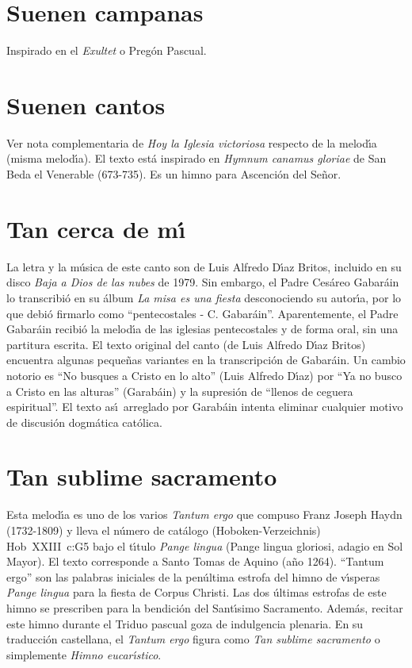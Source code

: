 \documentclass[landscape,12pt]{report}
\begin{document}
\section*{\small Suenen campanas} \noindent\footnotesize Inspirado en el \textit{Exultet} o Preg\'on Pascual.
\section*{\small Suenen cantos} Ver nota complementaria de \textit{Hoy la Iglesia victoriosa} respecto de la melod\'\i a (misma melod\'\i a). El texto est\'a inspirado en \textit{Hymnum canamus gloriae} de San Beda el Venerable (673-735). Es un himno para Ascenci\'on del Se\~nor.
\section*{\small Tan cerca de m\'\i } \noindent\footnotesize La letra y la m\'usica de este canto son de Luis Alfredo D\'\i az Britos, incluido en su disco \emph{Baja a Dios de las nubes} de 1979. Sin embargo, el Padre Ces\'areo Gabar\'ain lo transcribi\'o en su \'album \emph{La misa es una fiesta} desconociendo su autor\'\i a, por lo que debi\'o firmarlo como ``pentecostales - C. Gabar\'ain''. Aparentemente, el Padre Gabar\'ain recibi\'o la melod\'\i a de las iglesias pentecostales y de forma oral, sin una partitura escrita. El texto original del canto (de Luis Alfredo D\'\i az Britos) encuentra algunas peque\~nas variantes en la transcripci\'on de Gabar\'ain. Un cambio notorio es ``No busques a Cristo en lo alto'' (Luis Alfredo D\'\i az) por ``Ya no busco a Cristo en las alturas'' (Garab\'ain) y la supresi\'on de ``llenos de ceguera espiritual''. El texto as\'\i\ arreglado por Garab\'ain intenta eliminar cualquier motivo de discusi\'on dogm\'atica cat\'olica.
\section*{\small Tan sublime sacramento} \noindent\footnotesize Esta melod\'\i a es uno de los varios \textit{Tantum ergo} que compuso Franz Joseph Haydn (1732-1809) y lleva el n\'umero de cat\'alogo (Hoboken-Verzeichnis) Hob~XXIII~c:G5 bajo el t\'\i tulo \textit{Pange lingua} (Pange lingua gloriosi, adagio en Sol Mayor). El texto corresponde a Santo Tomas de Aquino (a\~no 1264). ``Tantum ergo'' son las palabras iniciales de la pen\'ultima estrofa del himno de v\'\i speras \textit{Pange lingua} para la fiesta de Corpus Christi. Las dos \'ultimas estrofas de este himno se prescriben para la bendici\'on del Sant\'\i simo Sacramento. Adem\'as, recitar este himno durante el Triduo pascual goza de indulgencia plenaria. En su traducci\'on castellana, el \textit{Tantum ergo} figura como \textit{Tan sublime sacramento} o simplemente \textit{Himno eucar\'\i stico}.
\end{document}
